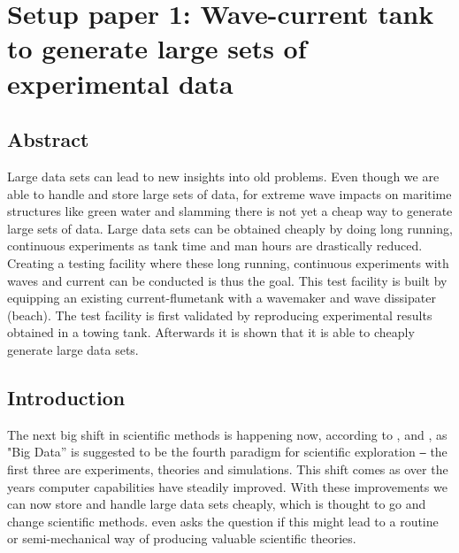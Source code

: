 \appendix
\chapter{Setup paper 1: Wave-current tank to generate large sets of experimental data}
\label{sec:setup1}

\section*{Abstract}
\label{sec:setup1_abstract}
Large data sets can lead to new insights into old problems. Even though we are able to handle and store large sets of data, for extreme wave impacts on maritime structures like green water and slamming there is not yet a cheap way to generate large sets of data. Large data sets can be obtained cheaply by doing long running, continuous experiments as tank time and man hours are drastically reduced. Creating a testing facility where these long running, continuous experiments with waves and current can be conducted is thus the goal. This test facility is built by equipping an existing current-flumetank with a wavemaker and wave dissipater (beach). The test facility is first validated by reproducing experimental results obtained in a towing tank. Afterwards it is shown that it is able to cheaply generate large data sets.


\section{Introduction}
\label{sec:setup1_intro}
The next big shift in scientific methods is happening now, according to \citet{Tolle2011}, \citet{George2016} and \citet{Fricke2015}, as "Big Data'' is suggested to be the fourth paradigm for scientific exploration \texttt{---} the first three are experiments, theories and simulations. This shift comes as over the years computer capabilities have steadily improved. With these improvements we can now store and handle large data sets cheaply, which is thought to go and change scientific methods. \citet{Fricke2015} even asks the question if this might lead to a routine or semi-mechanical way of producing valuable scientific theories.



